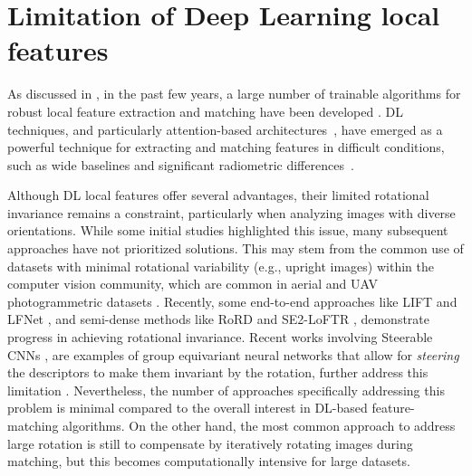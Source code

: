 
\section{Limitation of Deep Learning local features}\label{sec:5:limitation_dl_feats}

As discussed in , in the past few years, a large number of trainable algorithms for robust local feature extraction and matching have been developed \citep{Yao_2021, remondino2022_at_with_dl}.
DL techniques, and particularly attention-based architectures~\citep{vaswani2023attention}, have emerged as a powerful technique for extracting and matching features in difficult conditions, such as wide baselines and significant radiometric differences~\citep{jin_image_2021, Yao_2021}.

Although DL local features offer several advantages, their limited rotational invariance remains a constraint, particularly when analyzing images with diverse orientations. 
While some initial studies highlighted this issue, many subsequent approaches have not prioritized solutions. 
This may stem from the common use of datasets with minimal rotational variability (e.g., upright images) within the computer vision community, which are common in aerial and UAV photogrammetric datasets \cite{Bkman2022_se2loftr}. 
Recently, some end-to-end approaches like LIFT \citep{yi2016lift} and LFNet \citep{ono2018lfnet}, and semi-dense methods like RoRD \citep{parihar2022rord} and SE2-LoFTR \citep{Bkman2022_se2loftr}, demonstrate progress in achieving rotational invariance. 
Recent works involving Steerable CNNs \citep{cohen2016steerable, Wu2018_steerer}, are examples of group equivariant neural networks that allow for \textit{steering} the descriptors to make them invariant by the rotation, further address this limitation \cite{Weiler2019_e2cnn, cesa2022_escnn, Bkman2022_se2loftr}.
Nevertheless, the number of approaches specifically addressing this problem is minimal compared to the overall interest in DL-based feature-matching algorithms.
On the other hand, the most common approach to address large rotation is still to compensate by iteratively rotating images during matching, but this becomes computationally intensive for large datasets.

